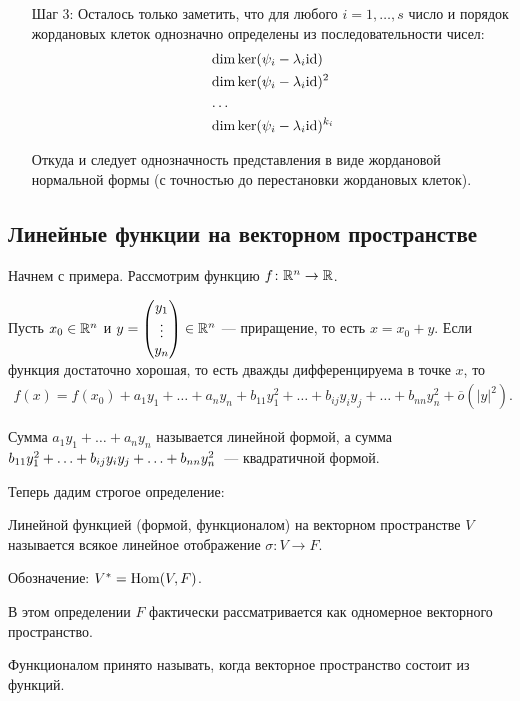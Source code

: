 \begin{itemize}
\item[Шаг 3:] Осталось только заметить, что для любого $i = 1, \ldots, s$  число и порядок жордановых клеток однозначно определены из последовательности чисел:
\begin{align*}
&\dim \ker (\psi_i - \lambda_i \mathrm{id}) \\
&\dim \ker (\psi_i - \lambda_i \mathrm{id}) ^ 2 \\
&\ldots \\
&\dim \ker (\psi_i - \lambda_i \mathrm{id})^{k_i}
\end{align*}

Откуда и следует однозначность представления в виде жордановой нормальной формы (с точностью до перестановки жордановых клеток).
\end{itemize}

\subsection*{Линейные функции на векторном пространстве}
Начнем с примера. Рассмотрим функцию $f \colon \mathbb{R}^n \rightarrow \mathbb{R}$.

Пусть $x_0 \in \mathbb{R}^n$ и $y = \begin{pmatrix}y_1 \\ \vdots \\ y_n\end{pmatrix} \in\mathbb{R}^n$ --- приращение, то есть $x = x_0 + y$. Если функция достаточно хорошая, то есть дважды дифференцируема в точке $x$, то
\begin{gather*}
f(x) = f(x_0) + a_1y_1 + \ldots + a_ny_n + b_{11}y_1^2 + \ldots + b_{ij}y_iy_j +\ldots + b_{nn}y_n^2 + \overline{o}(|y|^2).
\end{gather*}

Сумма $a_1y_1 + \ldots + a_ny_n$ называется линейной формой, а сумма $b_{11}y_1^2 + \ldots \hm+ b_{ij}y_iy_j + \ldots + b_{nn}y_n^2$~--- квадратичной формой.

Теперь дадим строгое определение:
\begin{Def}
Линейной функцией (формой, функционалом) на векторном пространстве $V$ называется всякое линейное отображение $\sigma \colon V \rightarrow F$. 

Обозначение: $V^* = \mathrm{Hom}(V, F)$.
\end{Def}

В этом определении $F$ фактически рассматривается как одномерное векторного пространство.

\begin{Comment}
Функционалом принято называть, когда векторное пространство состоит из функций.
\end{Comment}

